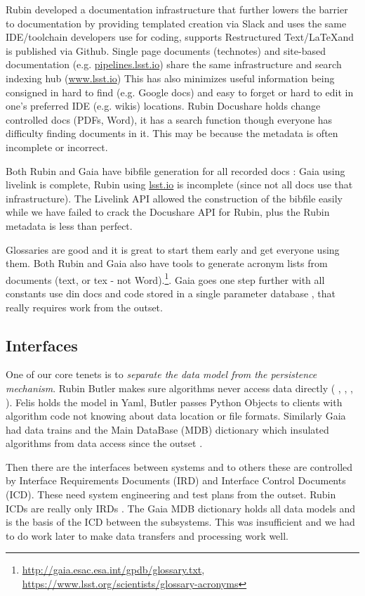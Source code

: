 \documentclass[11pt,twoside]{article}
\begin{document}
Rubin developed a documentation infrastructure that further lowers the barrier to documentation by providing templated creation via Slack and uses the same IDE/toolchain developers use for coding, supports Restructured Text/\LaTeX and is published via Github.
Single page documents (technotes) and site-based documentation (e.g. \url{ pipelines.lsst.io}) share the same infrastructure \citep{SQR-000} and search indexing hub (\url{www.lsst.io})
This has also minimizes useful information being consigned in hard to find (e.g. Google docs) and easy to forget or hard to edit in one’s preferred IDE (e.g. wikis) locations.
Rubin Docushare holds change controlled docs (PDFs, Word), it has a search function though everyone has difficulty finding documents in it.
This may be because the metadata is often incomplete or incorrect.

Both Rubin and Gaia have  bibfile generation for all recorded docs : Gaia using   livelink is  complete, Rubin using \url{lsst.io} is incomplete (since not all docs use that infrastructure).
The Livelink API allowed the construction of the bibfile easily while we have failed to crack the Docushare API for Rubin, plus the Rubin metadata is less than perfect.

Glossaries are good and it is great to start them early and get everyone using them.
Both Rubin and Gaia also have tools to generate acronym lists from documents (text, or tex - not Word).\footnote{\url{http://gaia.esac.esa.int/gpdb/glossary.txt}, \url{https://www.lsst.org/scientists/glossary-acronyms}}.  Gaia goes one step further with all constants use din docs and code stored in a single parameter database \citep{2005ESASP.576...67D}, that really requires work from the outset.


\subsection{Interfaces}
One of our core tenets is to \emph{separate the data model from the persistence mechanism}.
Rubin Butler makes sure algorithms  never access data directly (\cite{2022SPIE12189E..11J} , \cite{2019ASPC..523..653J}, \cite{C24_adassxxxii}, \cite{P52_adassxxxii}).
Felis holds the model in Yaml, Butler passes Python Objects to clients with algorithm code not knowing about data location or file formats.
Similarly Gaia had data trains and the Main DataBase (MDB) dictionary which insulated algorithms from data access since the outset \citep{1999BaltA...8...57O}.

Then there are the interfaces between systems and to others these are controlled by Interface Requirements Documents (IRD) and Interface Control Documents (ICD).
These need system engineering and test plans from the outset.
Rubin ICDs are really only IRDs .
The Gaia MDB dictionary holds all data models  \citep{2015ASPC..495...47H, 2011ASPC..442..351O}and is the basis of the ICD between the subsystems.
This was insufficient and we had to do work later to make data transfers and processing work well.
\end{document}
